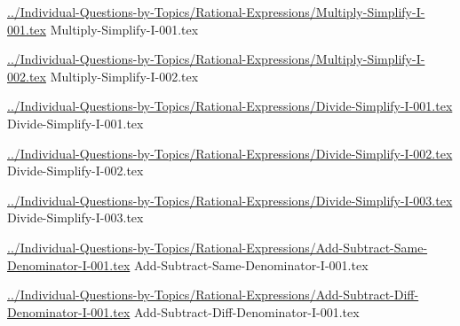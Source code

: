\documentclass[answer,cancelspace,12pt]{exam}
\begin{document}
\begin{questions}
\question
\href{../Individual-Questions-by-Topics/Rational-Expressions/Multiply-Simplify-I-001.tex}{../Individual-Questions-by-Topics/Rational-Expressions/Multiply-Simplify-I-001.tex}
{Multiply-Simplify-I-001.tex}


\question
\href{../Individual-Questions-by-Topics/Rational-Expressions/Multiply-Simplify-I-002.tex}{../Individual-Questions-by-Topics/Rational-Expressions/Multiply-Simplify-I-002.tex}
{Multiply-Simplify-I-002.tex}


\question
\href{../Individual-Questions-by-Topics/Rational-Expressions/Divide-Simplify-I-001.tex}{../Individual-Questions-by-Topics/Rational-Expressions/Divide-Simplify-I-001.tex}
{Divide-Simplify-I-001.tex}

\question
\href{../Individual-Questions-by-Topics/Rational-Expressions/Divide-Simplify-I-002.tex}{../Individual-Questions-by-Topics/Rational-Expressions/Divide-Simplify-I-002.tex}
{Divide-Simplify-I-002.tex}


\question
\href{../Individual-Questions-by-Topics/Rational-Expressions/Divide-Simplify-I-003.tex}{../Individual-Questions-by-Topics/Rational-Expressions/Divide-Simplify-I-003.tex}
{Divide-Simplify-I-003.tex}


\question
\href{../Individual-Questions-by-Topics/Rational-Expressions/Add-Subtract-Same-Denominator-I-001.tex}{../Individual-Questions-by-Topics/Rational-Expressions/Add-Subtract-Same-Denominator-I-001.tex}
{Add-Subtract-Same-Denominator-I-001.tex}


\question
\href{../Individual-Questions-by-Topics/Rational-Expressions/Add-Subtract-Diff-Denominator-I-001.tex}{../Individual-Questions-by-Topics/Rational-Expressions/Add-Subtract-Diff-Denominator-I-001.tex}
{Add-Subtract-Diff-Denominator-I-001.tex}



\end{questions}
\end{document}
